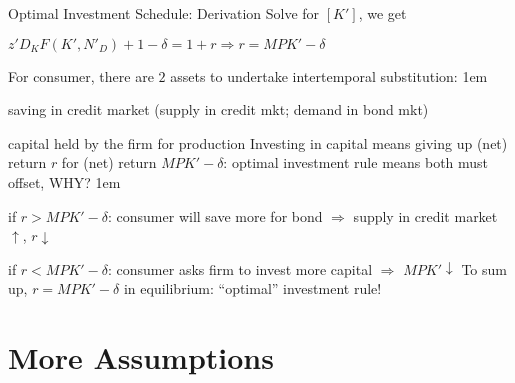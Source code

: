 \documentclass[11pt,aspectratio=43]{beamer}
\let\olditemize=\itemize
\let\endolditemize=\enditemize
\renewenvironment{itemize}{\olditemize \itemsep1em}{\endolditemize}
\let\oldenumerate=\enumerate
\let\endoldenumerate=\endenumerate
\renewenvironment{enumerate}{\oldenumerate \itemsep1em}{ \endoldenumerate}
\theoremstyle{definition}
\begin{document}
\begin{frame}{Optimal Investment Schedule: Derivation}
\label{slide:Optimal_Investment_Schedule__Derivation}
    Solve for $ [ K' ] $, we get
    \begin{center}
        $ \displaystyle z' D_{K} F( K', N'_{D} ) + 1 - \delta = 1+r \Rightarrow r = MPK' - \delta $
    \end{center}
    For consumer, there are $ 2 $ assets to undertake \alert{intertemporal substitution}:
    \begin{enumerate}
        \item saving in credit market (supply in credit mkt; demand in bond mkt)
        \item capital held by the firm for production
    \end{enumerate}
    Investing in capital means giving up (net) return $ r $ for (net) return $ MPK' - \delta $: \alert{optimal investment rule means both must offset, WHY?}
    \begin{itemize}
        \item if $ r > MPK' - \delta $: consumer will save more for bond $ \Rightarrow $ supply in credit market  $ \uparrow  $, $ r \downarrow  $
        \item if $ r < MPK' - \delta $: consumer asks firm to invest more capital $ \Rightarrow  $ $ MPK' \downarrow  $
    \end{itemize}
    To sum up, $ r = MPK' - \delta $ in equilibrium: ``optimal'' investment rule!

\end{frame}

\section{More Assumptions}
\label{sec:More_Assumptions}
\end{document}
